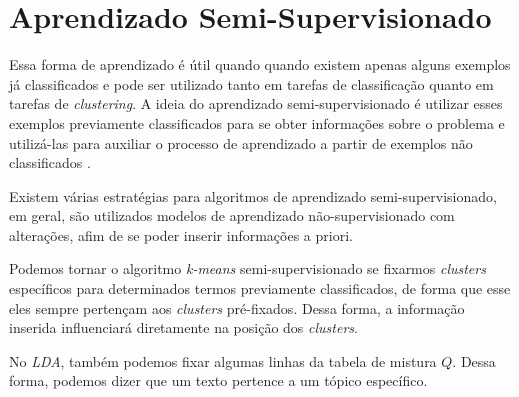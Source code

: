\clearpage
\section{Aprendizado Semi-Supervisionado}

Essa forma de aprendizado é útil quando quando existem apenas alguns exemplos já classificados e pode ser utilizado tanto em tarefas de classificação quanto em tarefas de \textit{clustering}. A ideia do aprendizado semi-supervisionado é utilizar esses exemplos previamente classificados para se obter informações sobre o problema e utilizá-las para auxiliar o processo de aprendizado a partir de exemplos não classificados \cite{bruce}.

Existem várias estratégias para algoritmos de aprendizado semi-supervisionado, em geral, são utilizados modelos de aprendizado não-supervisionado com alterações, afim de se poder inserir informações a priori.

Podemos tornar o algoritmo \textit{k-means} semi-supervisionado se fixarmos \textit{clusters} específicos para determinados termos previamente classificados, de forma que esse eles sempre pertençam aos \textit{clusters} pré-fixados. Dessa forma, a informação inserida influenciará diretamente na posição dos \textit{clusters}.

No \textit{LDA}, também podemos fixar algumas linhas da tabela de mistura \(Q\). Dessa forma, podemos dizer que um texto pertence a um tópico específico.
